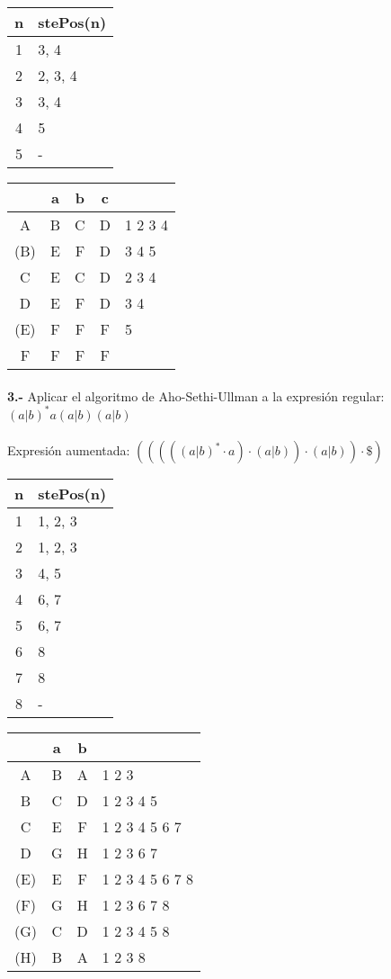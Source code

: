 \documentclass[11pt,a4paper]{report}
\begin{document}
\begin{tabular} {| c | l |}
\hline
n & stePos(n) \\ \hline
1 & 3, 4 \\ \hline
2 & 2, 3, 4 \\ \hline
3 & 3, 4 \\ \hline
4 & 5 \\ \hline
5 & - \\ \hline
\end{tabular}
\quad
\begin{tabular} {| c | c |c |c | l |}
\hline 
& a & b & c & \\ \hline
A & B & C & D & 1 2 3 4 \\ \hline
(B) & E & F & D & 3 4 5 \\ \hline
C & E & C & D & 2 3 4 \\ \hline
D & E & F & D & 3 4 \\ \hline
(E) & F & F & F & 5 \\ \hline
F & F & F & F & \\ \hline
\end{tabular}\paragraph{}
\textbf{3.-} Aplicar el algoritmo de Aho-Sethi-Ullman a la expresión regular: \textbf{$ (a|b)^*a(a|b)(a|b) $} \\
\\
Expresión aumentada: $ (((((a|b)^*\cdot a)\cdot (a|b))\cdot (a|b))\cdot \$ ) $ \\

\begin{tabular} {| c | l |}
\hline
n & stePos(n) \\ \hline
1 & 1, 2, 3 \\ \hline
2 & 1, 2, 3 \\ \hline
3 & 4, 5 \\ \hline
4 & 6, 7 \\ \hline
5 & 6, 7 \\ \hline
6 & 8 \\ \hline
7 & 8 \\ \hline
8 & - \\ \hline
\end{tabular}
\quad
\begin{tabular} {| c | c |c | l |}
\hline 
& a & b & \\ \hline
A & B & A & 1 2 3 \\ \hline
B & C & D & 1 2 3 4 5 \\ \hline
C & E & F & 1 2 3 4 5 6 7 \\ \hline
D & G & H & 1 2 3 6 7 \\ \hline
(E) & E & F & 1 2 3 4 5 6 7 8 \\ \hline
(F) & G & H & 1 2 3 6 7 8 \\ \hline
(G) & C & D & 1 2 3 4 5 8 \\ \hline
(H) & B & A & 1 2 3 8 \\ \hline
\end{tabular}
\end{document}
